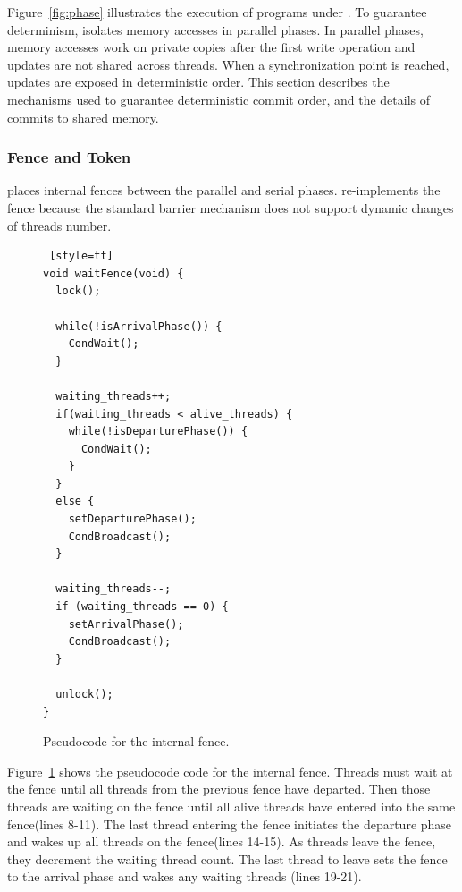 Figure~\ref{fig:phase} illustrates the execution of programs under \dthreads{}.  To guarantee determinism, \dthreads{} isolates memory accesses in parallel phases. In parallel phases, memory accesses work on private copies after the first write operation and updates are not shared across threads.  When a synchronization point is reached, updates are exposed in deterministic order.  This section describes the mechanisms used to guarantee deterministic commit order, and the details of commits to shared memory.

\subsubsection{Fence and Token}
\label{sec:schedule}

\dthreads{} places internal fences between the parallel and serial phases. \dthreads{} re-implements the fence because the standard \pthreads{} barrier mechanism does not support dynamic changes of threads number. 

\begin{figure}
\begin{lstlisting} [style=tt]
void waitFence(void) {
  lock();
	
  while(!isArrivalPhase()) { 
    CondWait();
  }

  waiting_threads++;
  if(waiting_threads < alive_threads) {
    while(!isDeparturePhase()) {
      CondWait();
    }
  } 
  else {
    setDeparturePhase();
    CondBroadcast();
  }

  waiting_threads--;
  if (waiting_threads == 0) {
    setArrivalPhase();
    CondBroadcast();
  }

  unlock();
}

\end{lstlisting}
\caption{Pseudocode for the internal fence.\label{fig:internalFence}}
\end{figure}

Figure~\ref{fig:internalFence} shows the pseudocode code for the internal fence. Threads must wait at the fence 
until all threads from the previous fence have departed. Then those threads are waiting on the fence until all alive threads  have entered into the same fence(lines 8-11). 
The last thread entering the fence initiates the departure phase and wakes up all threads on the fence(lines 14-15). As threads leave the fence, they decrement the waiting thread count.  The last thread to leave sets the fence to the arrival phase and wakes any waiting threads (lines 19-21).

